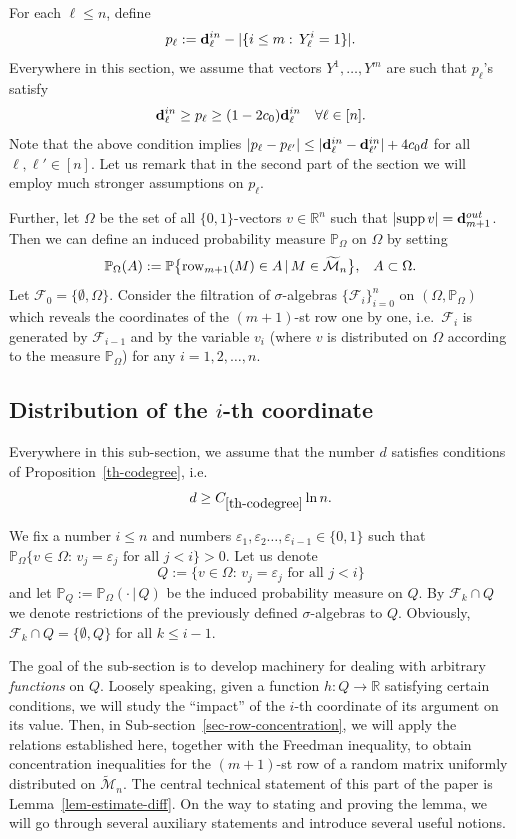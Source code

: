 \documentclass[12pt]{article}
\theoremstyle{definition}
\theoremstyle{plain}
\newcommand{\R}{\mathbb{R}}
\newcommand{\supp}{{\rm supp\,}}
\def\Prob{{\mathbb P}}
\def\InDeg{{\bf d}^{in}}
\def\OutDeg{{\bf d}^{out}}
\def\MatrixSet{{\mathcal M}_n}
\def\Row{{\rm row}}
\begin{document}
For each $\ell\leq n$, define
\begin{equation}\label{eq: pl fixed rows}
p_\ell:=\InDeg_\ell-|\{i\leq m:\, Y^i_\ell=1\}|.
\end{equation}
Everywhere in this section, we assume that vectors $Y^1,\ldots,Y^m$ are such that
$p_\ell$'s satisfy
\begin{equation}\label{eq: pl strong}
\InDeg_\ell\geq p_\ell\geq (1-2c_0)\InDeg_\ell\quad \forall \ell\in[n].
\end{equation}
Note that the above condition implies $\vert p_\ell-p_{\ell'}\vert \leq |\InDeg_\ell-\InDeg_{\ell'}|+4c_0d$
for all $\ell,\ell'\in [n]$.
Let us remark that in the second part of the section we will employ much stronger assumptions on $p_\ell$.

Further, let $\Omega$ be the set of all $\{0,1\}$-vectors $v\in\R^n$ such that $|\supp v|=\OutDeg_{m+1}$.
Then we can define an induced probability measure $\Prob_\Omega$ on $\Omega$ by setting
$$\Prob_\Omega(A):=\Prob\bigl\{\Row_{m+1}(M)\in A\,|\,M\in\widetilde\MatrixSet\bigr\},\;\;\;A\subset\Omega.$$
Let $\mathcal{F}_0=\{\emptyset, \Omega\}$. Consider the filtration of $\sigma$-algebras $\{\mathcal{F}_i\}_{i=0}^{n}$
on $(\Omega,\Prob_\Omega)$ 
which reveals the coordinates of the $(m+1)$-st row one by one, i.e.\ 
$\mathcal{F}_i$ is generated by $\mathcal{F}_{i-1}$ and by the variable $v_i$ (where $v$ is distributed on $\Omega$
according to the measure $\Prob_\Omega$)
for any $i=1,2,\ldots,n$.


\subsection{Distribution of the $i$-th coordinate}\label{sec-i-coord}

Everywhere in this sub-section, we assume that the number $d$ satisfies conditions of
Proposition~\ref{th-codegree}, i.e.\
$$d\geq C_{\ref{th-codegree}}\ln n.$$

We fix a number $i\leq n$ and numbers $\varepsilon_1,\varepsilon_2\ldots,\varepsilon_{i-1}\in\{0,1\}$
such that $\Prob_{\Omega}\{v\in\Omega:\,v_j=\varepsilon_j\mbox{ for all }j<i\}>0$.
Let us denote
$$Q:=\{v\in\Omega:\,v_j=\varepsilon_j\mbox{ for all }j<i\}$$
and let $\Prob_Q:=\Prob_\Omega(\cdot\,|\,Q)$ be the induced probability measure on $Q$.
By $\mathcal{F}_{k}\cap Q$ we denote restrictions of the previously defined $\sigma$-algebras to $Q$.
Obviously, $\mathcal{F}_{k}\cap Q=\{\emptyset,Q\}$ for all $k\leq i-1$.

The goal of the sub-section is to develop machinery for dealing with arbitrary {\it functions} on $Q$.
Loosely speaking, given a function $h:Q\to \R$ satisfying certain conditions, we will study the ``impact''
of the $i$-th coordinate of its argument on its value. Then, in Sub-section~\ref{sec-row-concentration},
we will apply the relations established here, together with the Freedman inequality,
to obtain concentration inequalities for the $(m+1)$-st row
of a random matrix uniformly distributed on $\widetilde\MatrixSet$.
The central technical statement of this part of the paper is Lemma~\ref{lem-estimate-diff}.
On the way to stating and proving the lemma, we will go through several auxiliary statements
and introduce several useful notions.
\end{document}
